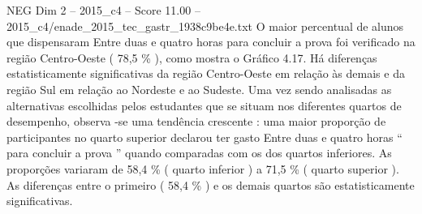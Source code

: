 \begin{textsample}{NEG Dim 2 – 2015\_c4 – Score 11.00 – 2015\_c4/enade\_2015\_tec\_gastr\_1938c9be4e.txt}
O maior percentual de alunos que dispensaram Entre duas e quatro horas para concluir a prova foi verificado na região Centro-Oeste ( 78,5 \% ), como mostra o Gráfico 4.17.
Há diferenças estatisticamente significativas da região Centro-Oeste em relação às demais e da região Sul em relação ao Nordeste e ao Sudeste.
Uma vez sendo analisadas as alternativas escolhidas pelos estudantes que se situam nos diferentes quartos de desempenho, observa -se uma tendência crescente : uma maior proporção de participantes no quarto superior declarou ter gasto Entre duas e quatro horas “ para concluir a prova ” quando comparadas com os dos quartos inferiores.
As proporções variaram de 58,4 \% ( quarto inferior ) a 71,5 \% ( quarto superior ).
As diferenças entre o primeiro ( 58,4 \% ) e os demais quartos são estatisticamente significativas.

\end{textsample}
